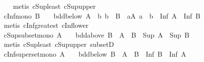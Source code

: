 \begin{isabellebody}
%
\isadelimproof
\ \ %
\endisadelimproof
%
\isatagproof
{}\isamarkupfalse%
\ {\isacharparenleft}{\kern0pt}metis\ cSup{\isacharunderscore}{\kern0pt}least\ cSup{\isacharunderscore}{\kern0pt}upper{}{\isacharparenright}{\kern0pt}%
\endisatagproof
{\isafoldproof}%
%
\isadelimproof
\isanewline
%
\endisadelimproof
\isanewline
{}\isamarkupfalse%
\ cInf{\isacharunderscore}{\kern0pt}mono{\isacharcolon}{\kern0pt}\ {\isachardoublequoteopen}B\ {\isasymnoteq}\ {\isacharbraceleft}{\kern0pt}{\isacharbraceright}{\kern0pt}\ {\isasymLongrightarrow}\ bdd{\isacharunderscore}{\kern0pt}below\ A\ {\isasymLongrightarrow}\ {\isacharparenleft}{\kern0pt}{\isasymAnd}b{\isachardot}{\kern0pt}\ b\ {\isasymin}\ B\ {\isasymLongrightarrow}\ {\isasymexists}a{\isasymin}A{\isachardot}{\kern0pt}\ a\ {\isasymle}\ b{\isacharparenright}{\kern0pt}\ {\isasymLongrightarrow}\ Inf\ A\ {\isasymle}\ Inf\ B{\isachardoublequoteclose}\isanewline
%
\isadelimproof
\ \ %
\endisadelimproof
%
\isatagproof
{}\isamarkupfalse%
\ {\isacharparenleft}{\kern0pt}metis\ cInf{\isacharunderscore}{\kern0pt}greatest\ cInf{\isacharunderscore}{\kern0pt}lower{}{\isacharparenright}{\kern0pt}%
\endisatagproof
{\isafoldproof}%
%
\isadelimproof
\isanewline
%
\endisadelimproof
\isanewline
{}\isamarkupfalse%
\ cSup{\isacharunderscore}{\kern0pt}subset{\isacharunderscore}{\kern0pt}mono{\isacharcolon}{\kern0pt}\ {\isachardoublequoteopen}A\ {\isasymnoteq}\ {\isacharbraceleft}{\kern0pt}{\isacharbraceright}{\kern0pt}\ {\isasymLongrightarrow}\ bdd{\isacharunderscore}{\kern0pt}above\ B\ {\isasymLongrightarrow}\ A\ {\isasymsubseteq}\ B\ {\isasymLongrightarrow}\ Sup\ A\ {\isasymle}\ Sup\ B{\isachardoublequoteclose}\isanewline
%
\isadelimproof
\ \ %
\endisadelimproof
%
\isatagproof
{}\isamarkupfalse%
\ {\isacharparenleft}{\kern0pt}metis\ cSup{\isacharunderscore}{\kern0pt}least\ cSup{\isacharunderscore}{\kern0pt}upper\ subsetD{\isacharparenright}{\kern0pt}%
\endisatagproof
{\isafoldproof}%
%
\isadelimproof
\isanewline
%
\endisadelimproof
\isanewline
{}\isamarkupfalse%
\ cInf{\isacharunderscore}{\kern0pt}superset{\isacharunderscore}{\kern0pt}mono{\isacharcolon}{\kern0pt}\ {\isachardoublequoteopen}A\ {\isasymnoteq}\ {\isacharbraceleft}{\kern0pt}{\isacharbraceright}{\kern0pt}\ {\isasymLongrightarrow}\ bdd{\isacharunderscore}{\kern0pt}below\ B\ {\isasymLongrightarrow}\ A\ {\isasymsubseteq}\ B\ {\isasymLongrightarrow}\ Inf\ B\ {\isasymle}\ Inf\ A{\isachardoublequoteclose}\isanewline
%
\isadelimproof
\ \ %
\endisadelimproof
%
\isatagproof
{}\isamarkupfalse%

\end{isabellebody}
